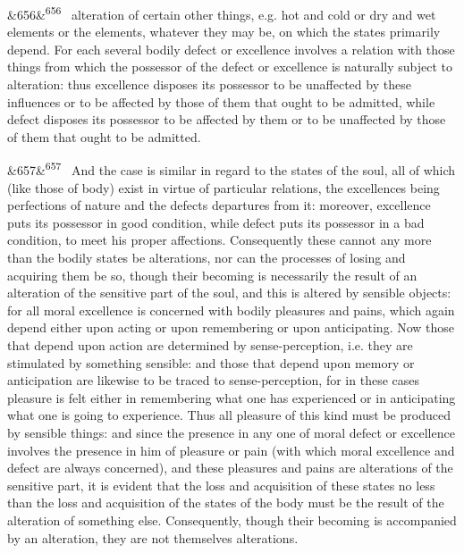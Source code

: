 \documentclass[12pt]{article}
\newcommand{\para}[1][]{\par\noindent\ifx&#1&\else\textsuperscript{\footnotesize #1}~\fi}
\begin{document}
\para[656] alteration of certain other things, e.g. hot and cold or dry and wet elements or the elements, whatever they may be, on which the states primarily depend. For each several bodily defect or excellence involves a relation with those things from which the possessor of the defect or excellence is naturally subject to alteration: thus excellence disposes its possessor to be unaffected by these influences or to be affected by those of them that ought to be admitted, while defect disposes its possessor to be affected by them or to be unaffected by those of them that ought to be admitted.

\para[657] And the case is similar in regard to the states of the soul, all of which (like those of body) exist in virtue of particular relations, the excellences being perfections of nature and the defects departures from it: moreover, excellence puts its possessor in good condition, while defect puts its possessor in a bad condition, to meet his proper affections. Consequently these cannot any more than the bodily states be alterations, nor can the processes of losing and acquiring them be so, though their becoming is necessarily the result of an alteration of the sensitive part of the soul, and this is altered by sensible objects: for all moral excellence is concerned with bodily pleasures and pains, which again depend either upon acting or upon remembering or upon anticipating. Now those that depend upon action are determined by sense-perception, i.e. they are stimulated by something sensible: and those that depend upon memory or anticipation are likewise to be traced to sense-perception, for in these cases pleasure is felt either in remembering what one has experienced or in anticipating what one is going to experience. Thus all pleasure of this kind must be produced by sensible things: and since the presence in any one of moral defect or excellence involves the presence in him of pleasure or pain (with which moral excellence and defect are always concerned), and these pleasures and pains are alterations of the sensitive part, it is evident that the loss and acquisition of these states no less than the loss and acquisition of the states of the body must be the result of the alteration of something else. Consequently, though their becoming is accompanied by an alteration, they are not themselves alterations.
\end{document}
